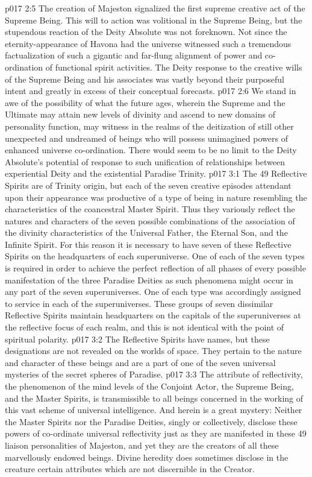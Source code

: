 \vs p017 2:5 \pc The creation of Majeston signalized the first supreme creative act of the Supreme Being. This will to action was volitional in the Supreme Being, but the stupendous reaction of the Deity Absolute was not foreknown. Not since the eternity\hyp{}appearance of Havona had the universe witnessed such a tremendous factualization of such a gigantic and far\hyp{}flung alignment of power and co\hyp{}ordination of functional spirit activities. The Deity response to the creative wills of the Supreme Being and his associates was vastly beyond their purposeful intent and greatly in excess of their conceptual forecasts.
\vs p017 2:6 We stand in awe of the possibility of what the future ages, wherein the Supreme and the Ultimate may attain new levels of divinity and ascend to new domains of personality function, may witness in the realms of the deitization of still other unexpected and undreamed of beings who will possess unimagined powers of enhanced universe co\hyp{}ordination. There would seem to be no limit to the Deity Absolute’s potential of response to such unification of relationships between experiential Deity and the existential Paradise Trinity.
\vs p017 3:1 The 49 Reflective Spirits are of Trinity origin, but each of the seven creative episodes attendant upon their appearance was productive of a type of being in nature resembling the characteristics of the coancestral Master Spirit. Thus they variously reflect the natures and characters of the seven possible combinations of the association of the divinity characteristics of the Universal Father, the Eternal Son, and the Infinite Spirit. For this reason it is necessary to have seven of these Reflective Spirits on the headquarters of each superuniverse. One of each of the seven types is required in order to achieve the perfect reflection of all phases of every possible manifestation of the three Paradise Deities as such phenomena might occur in any part of the seven superuniverses. One of each type was accordingly assigned to service in each of the superuniverses. These groups of seven dissimilar Reflective Spirits maintain headquarters on the capitals of the superuniverses at the reflective focus of each realm, and this is not identical with the point of spiritual polarity.
\vs p017 3:2 The Reflective Spirits have names, but these designations are not revealed on the worlds of space. They pertain to the nature and character of these beings and are a part of one of the seven universal mysteries of the secret spheres of Paradise.
\vs p017 3:3 The attribute of reflectivity, the phenomenon of the mind levels of the Conjoint Actor, the Supreme Being, and the Master Spirits, is transmissible to all beings concerned in the working of this vast scheme of universal intelligence. And herein is a great mystery: Neither the Master Spirits nor the Paradise Deities, singly or collectively, disclose these powers of co\hyp{}ordinate universal reflectivity just as they are manifested in these 49 liaison personalities of Majeston, and yet they are the creators of all these marvellously endowed beings. Divine heredity does sometimes disclose in the creature certain attributes which are not discernible in the Creator.

